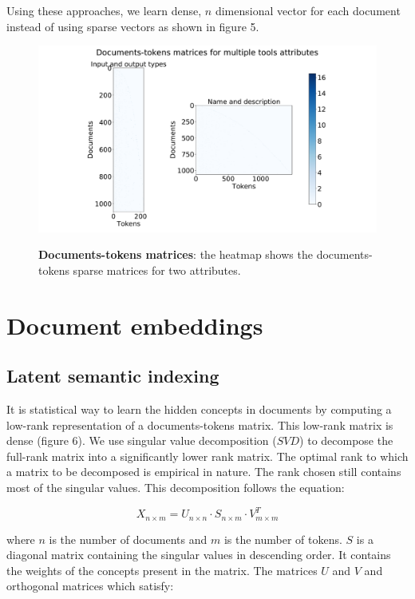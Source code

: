 Using these approaches, we learn dense, $n$ dimensional vector for each document instead of using sparse vectors as shown in figure 5. 

\begin{figure}[h]
\begin{centering}
    {\includegraphics[scale=0.33]{figures/Document_tokens_full_rank.pdf}}
    \caption[Documents-tokens matrices]{\textbf{Documents-tokens matrices}: the heatmap shows the documents-tokens sparse matrices for two attributes.}
\end{centering}
\end{figure}

    
\section{Document embeddings}
\subsection{Latent semantic indexing}
    It is statistical way to learn the hidden concepts in documents by computing a low-rank representation of a documents-tokens matrix. This low-rank matrix is dense (figure 6). We use singular value decomposition ($SVD$) to decompose the full-rank matrix into a significantly lower rank matrix. The optimal rank to which a matrix to be decomposed is empirical in nature. The rank chosen still contains most of the singular values. This decomposition follows the equation:
    
    \begin{equation}
    X_{n \times m} = U_{n \times n} \cdot S_{n \times m} \cdot V_{m \times m}^T
    \end{equation}
    
    where $n$ is the number of documents and $m$ is the number of tokens. $S$ is a diagonal matrix containing the singular values in descending order. It contains the weights of the concepts present in the matrix. The matrices $U$ and $V$ and orthogonal matrices which satisfy:
    
